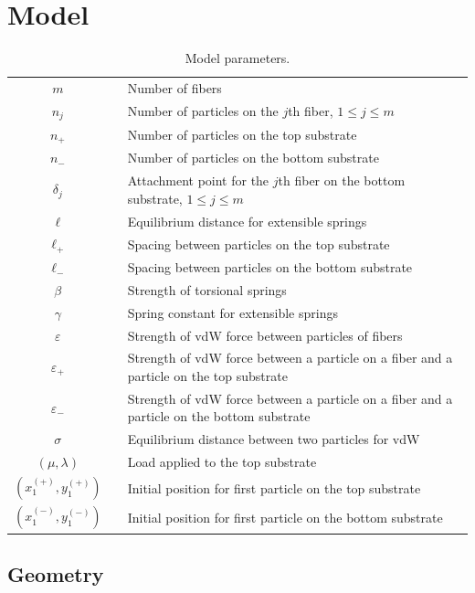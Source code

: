 \chapter{Model} \label{chap:two}

\begin{table}[t]
	\centering
	\caption{Model parameters. \label{table:parameters}}
	\begin{tabular}{c p{.25in} p{4.5in}}
		$m$ & & Number of fibers \\
		$n_j$ & & Number of particles on the $j$th fiber, $1 \leq j \leq m$ \\
		$n_+$ & & Number of particles on the top substrate \\
		$n_-$ & & Number of particles on the bottom substrate \\
		$\delta_j$ & & Attachment point for the $j$th fiber on the bottom substrate, $1 \leq j \leq m$ \\
		$\ell$ & & Equilibrium distance for extensible springs \\
		$\ell_+$ & & Spacing between particles on the top substrate \\
		$\ell_-$ & & Spacing between particles on the bottom substrate \\
		$\beta$ & & Strength of torsional springs \\
		$\gamma$ & & Spring constant for extensible springs \\
		$\varepsilon$ & & Strength of vdW force between particles of fibers \\
		$\varepsilon_+$ & & Strength of vdW force between a particle on a fiber and a particle on the top substrate \\
		$\varepsilon_-$ & & Strength of vdW force between a particle on a fiber and a particle on the bottom substrate \\
		$\sigma$ & & Equilibrium distance between two particles for vdW \\
		$(\mu,\lambda)$ & & Load applied to the top substrate \\
		$(x^{(+)}_1,y^{(+)}_1)$ & & Initial position for first particle on the top substrate \\
		$(x^{(-)}_1,y^{(-)}_1)$ & & Initial position for first particle on the bottom substrate
	\end{tabular}
\end{table}	
	
\section{Geometry}

